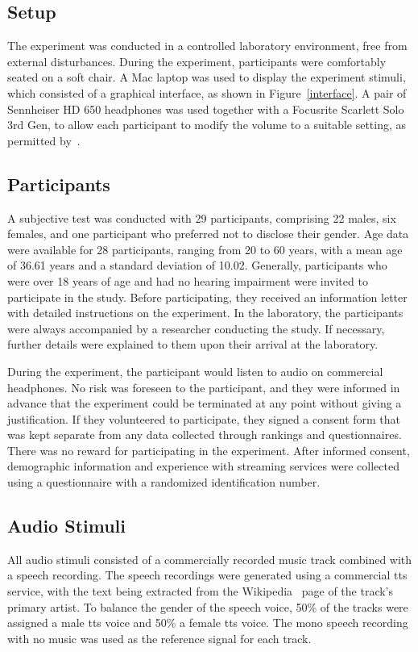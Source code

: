 \documentclass[a4paper,10pt]{edpsci} %
\begin{document}
\subsection{Setup}
The experiment was conducted in a controlled laboratory environment, free from external disturbances. During the experiment, participants were comfortably seated on a soft chair. A Mac laptop was used to display the experiment stimuli, which consisted of a graphical interface, as shown in Figure~\ref{interface}. A pair of Sennheiser HD 650 headphones was used together with a Focusrite Scarlett Solo 3rd Gen, to allow each participant to modify the volume to a suitable setting, as permitted by~\cite{itu-r-bs-1534_MUSHRA}.

\subsection{Participants}

A subjective test was conducted with 29 participants, comprising 22 males, six females, and one participant who preferred not to disclose their gender. Age data were available for 28 participants, ranging from 20 to 60 years, with a mean age of 36.61 years and a standard deviation of 10.02. Generally, participants who were over 18 years of age and had no hearing impairment were invited to participate in the study. Before participating, they received an information letter with detailed instructions on the experiment. In the laboratory, the participants were always accompanied by a researcher conducting the study. If necessary, further details were explained to them upon their arrival at the laboratory. 

During the experiment, the participant would listen to audio on commercial headphones. No risk was foreseen to the participant, and they were informed in advance that the experiment could be terminated at any point without giving a justification. If they volunteered to participate, they signed a consent form that was kept separate from any data collected through rankings and questionnaires. There was no reward for participating in the experiment. After informed consent, demographic information and experience with streaming services were collected using a questionnaire with a randomized identification number. 

\subsection{Audio Stimuli}
\label{subsec:audio_stimuli}
All audio stimuli consisted of a commercially recorded music track combined with a speech recording. The speech recordings were generated using a commercial \gls{tts} service, with the text being extracted from the Wikipedia~\cite{wikipedia} page of the track's primary artist. To balance the gender of the speech voice, 50\% of the tracks were assigned a male \gls{tts} voice and 50\% a female \gls{tts} voice. The mono speech recording with no music was used as the reference signal for each track. 
\end{document}
